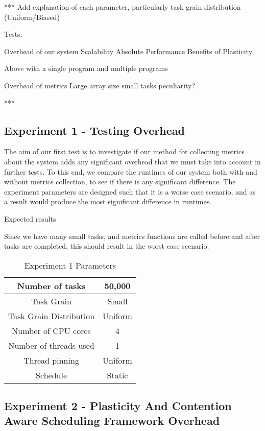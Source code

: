 *** Add explanation of each parameter, particularly task grain distribution (Uniform/Biased)

Tests:

Overhead of our system
Scalability
Absolute Performance
Benefits of Plasticity

Above with a single program and multiple programs

Overhead of metrics
Large array size small tasks peculiarity?

***

\subsection{Experiment 1 - Testing Overhead}

The aim of our first test is to investigate if our method for collecting metrics about the system adds any significant overhead that we must take into account in further tests. To this end, we compare the runtimes of our system both with and without metrics collection, to see if there is any significant difference. The experiment parameters are designed such that it is a worse case scenario, and as a result would produce the most significant difference in runtimes.


Expected results

Since we have many small tasks, and metrics functions are called before and after tasks are completed, this should result in the worst case scenario.

\begin{table}
\centering
	\begin{tabular}{|c|c|}
		\hline
		Number of tasks & 50,000 \\
		\hline
		Task Grain & Small \\
		\hline
		Task Grain Distribution & Uniform \\
		\hline
		Number of CPU cores & 4 \\
		\hline
		Number of threads used & 1 \\
		\hline
		Thread pinning & Uniform \\
		\hline
		Schedule & Static \\
		\hline
	\end{tabular}
\caption{Experiment 1 Parameters}
\label{table:ex1_parameters}
\end{table}






\subsection{Experiment 2 - Plasticity And Contention Aware Scheduling Framework Overhead}

